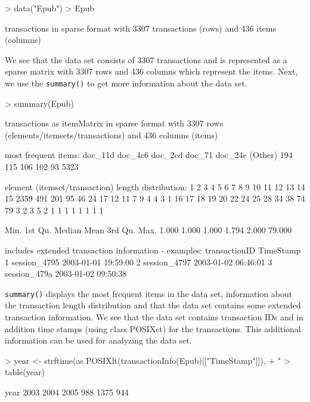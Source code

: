 \documentclass[10pt,a4paper]{article}
\newcommand{\class}[1]{\mbox{\textsf{#1}}}
\newcommand{\func}[1]{\mbox{\texttt{#1()}}}
\begin{document}
\begin{Schunk}
\begin{Sinput}
> data("Epub")
> Epub
\end{Sinput}
\begin{Soutput}
transactions in sparse format with
 3307 transactions (rows) and
 436 items (columns)
\end{Soutput}
\end{Schunk}

We see that the data set consists of 3307 transactions
and is represented as a sparse matrix with 3307 rows
and 436 columns which represent the items. 
Next, we use the \func{summary} to get more information about the 
data set.

\begin{Schunk}
\begin{Sinput}
> summary(Epub)
\end{Sinput}
\begin{Soutput}
transactions as itemMatrix in sparse format with
 3307 rows (elements/itemsets/transactions) and
 436 columns (items)

most frequent items:
doc_11d doc_4c6 doc_2cd  doc_71 doc_24e (Other) 
    194     115     106     102      93    5323 

element (itemset/transaction) length distribution:
   1    2    3    4    5    6    7    8    9   10   11   12   13   14   15 
2359  491  201   95   46   24   17   12   11    7    9    4    4    3    1 
  16   17   18   19   20   22   24   25   28   34   38   74   79 
   3    2    3    5    2    1    1    1    1    1    1    1    1 

   Min. 1st Qu.  Median    Mean 3rd Qu.    Max. 
  1.000   1.000   1.000   1.794   2.000  79.000 

includes extended transaction information - examples:
  transactionID           TimeStamp
1  session_4795 2003-01-01 19:59:00
2  session_4797 2003-01-02 06:46:01
3  session_479a 2003-01-02 09:50:38
\end{Soutput}
\end{Schunk}

\func{summary} displays the most frequent items in the data set,
information about the transaction length distribution and that the data
set contains some extended transaction information.  We see that the
data set contains transaction IDs and in addition time stamps (using
class \class{POSIXct}) for the transactions.  This additional
information can be used for analyzing the data set.

\begin{Schunk}
\begin{Sinput}
> year <- strftime(as.POSIXlt(transactionInfo(Epub)[["TimeStamp"]]), 
+     "%
> table(year)
\end{Sinput}
\begin{Soutput}
year
2003 2004 2005 
 988 1375  944 
\end{Soutput}
\end{Schunk}
\end{document}
